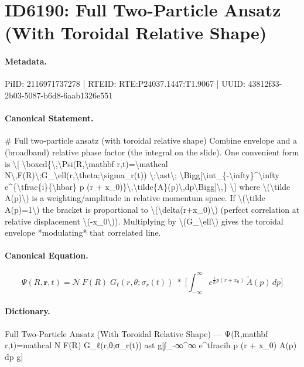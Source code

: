 \section*{ID6190: Full Two-Particle Ansatz (With Toroidal Relative Shape)}
\paragraph{Metadata.}
PiID: 2116971737278 | RTEID: RTE:P24037.1447:T1.9067 | UUID: 43812f33-2b03-5087-b6d8-6aab1326e551

\paragraph{Canonical Statement.}
\# Full two-particle ansatz (with toroidal relative shape) Combine envelope and a (broadband) relative phase factor (the integral on the slide). One convenient form is \textbackslash{}[ \textbackslash{}boxed\{\textbackslash{},\textbackslash{}Psi(R,\textbackslash{}mathbf r,t)=\textbackslash{}mathcal N\textbackslash{},F(R)\textbackslash{};G\_\textbackslash{}ell(r,\textbackslash{}theta;\textbackslash{}sigma\_r(t)) \textbackslash{};\textbackslash{}ast\textbackslash{}; \textbackslash{}Bigg[\textbackslash{}int\_\{-\textbackslash{}infty\}\textasciicircum{}\textbackslash{}infty e\textasciicircum{}\{\textbackslash{}tfrac\{i\}\{\textbackslash{}hbar\} p (r + x\_0)\}\textbackslash{},\textbackslash{}tilde\{A\}(p)\textbackslash{},dp\textbackslash{}Bigg]\textbackslash{},\} \textbackslash{}] where \textbackslash{}(\textbackslash{}tilde A(p)\textbackslash{}) is a weighting/amplitude in relative momentum space. If \textbackslash{}(\textbackslash{}tilde A(p)=1\textbackslash{}) the bracket is proportional to \textbackslash{}(\textbackslash{}delta(r+x\_0)\textbackslash{}) (perfect correlation at relative displacement \textbackslash{}(-x\_0\textbackslash{})). Multiplying by \textbackslash{}(G\_\textbackslash{}ell\textbackslash{}) gives the toroidal envelope *modulating* that correlated line.

\paragraph{Canonical Equation.}
\[
\boxed{\,\Psi(R,\mathbf r,t)=\mathcal N\,F(R)\;G_\ell(r,\theta;\sigma_r(t)) \;\ast\; \Bigg[\int_{-\infty}^\infty e^{\tfrac{i}{\hbar} p (r + x_0)}\,\tilde{A}(p)\,dp\Bigg]\,}
\]

\paragraph{Dictionary.}
Full Two-Particle Ansatz (With Toroidal Relative Shape) — Ψ(R,mathbf r,t)=mathcal N F(R) G\_ℓ(r,θ;σ\_r(t)) ast g[∫\_-∞\textasciicircum{}∞ e\textasciicircum{}tfraciħ p (r + x\_0) A(p) dp g]


